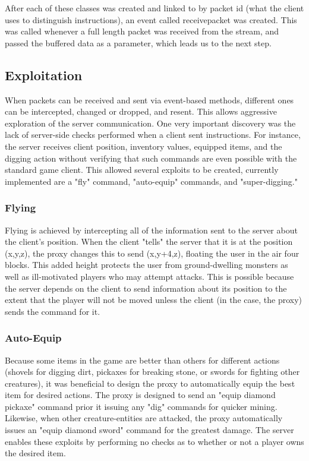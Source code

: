 \documentclass[12pt]{article}
\begin{document}
After each of these classes was created and linked to by packet id (what the client uses to distinguish instructions), an event called receive\textunderscore{}packet was created. This was called whenever a full length packet was received from the stream, and passed the buffered data as a parameter, which leads us to the next step.

\subsection{Exploitation}
When packets can be received and sent via event-based methods, different ones can be intercepted, changed or dropped, and resent. This allows aggressive exploration of the server communication. One very important discovery was the lack of server-side checks performed when a client sent instructions. For instance, the server receives client position, inventory values, equipped items, and the digging action without verifying that such commands are even possible with the standard game client. This allowed several exploits to be created, currently implemented are a "fly" command, "auto-equip" commands, and "super-digging."

\subsubsection{Flying}
Flying is achieved by intercepting all of the information sent to the server about the client's position. When the client "tells" the server that it is at the position (x,y,z), the proxy changes this to send (x,y+4,z), floating the user in the air four blocks. This added height protects the user from ground-dwelling monsters as well as ill-motivated players who may attempt attacks. This is possible because the server depends on the client to send information about its position to the extent that the player will not be moved unless the client (in the case, the proxy) sends the command for it.

\subsubsection{Auto-Equip}
Because some items in the game are better than others for different actions (shovels for digging dirt, pickaxes for breaking stone, or swords for fighting other creatures), it was beneficial to design the proxy to automatically equip the best item for desired actions. The proxy is designed to send an "equip diamond pickaxe" command prior it issuing any "dig" commands for quicker mining. Likewise, when other creature-entities are attacked, the proxy automatically issues an "equip diamond sword" command for the greatest damage. The server enables these exploits by performing no checks as to whether or not a player owns the desired item.
\end{document}
